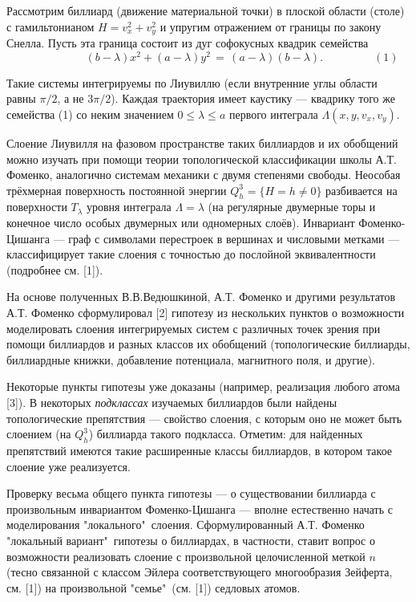 \vzmscaption

Рассмотрим биллиард (движение материальной точки) в плоской области (столе) с гамильтонианом $H = v_x^2 + v_y^2$ и упругим отражением от границы по закону Снелла. Пусть эта граница состоит из дуг софокусных квадрик семейства
\[ \qquad \qquad \qquad (b - \lambda) x^2 + (a - \lambda) y^2 \, = \, (a - \lambda) (b - \lambda). \qquad\qquad \,\,\, (1)\]

Такие системы интегрируемы по Лиувиллю (если внутренние углы области равны $\pi\slash 2$, а не $3\pi\slash 2$). Каждая траектория имеет каустику --- квадрику того же семейства (1) со неким значением $0 \le \lambda \le a$ первого интеграла $\Lambda(x, y, v_x, v_y)$.

Слоение Лиувилля на фазовом пространстве таких биллиардов и их обобщений можно изучать при помощи теории топологической классификации школы А.Т. Фоменко, аналогично системам механики с двумя степенями свободы. Неособая трёхмерная поверхность постоянной энергии $Q^3_h = \{H = h \ne 0\}$ разбивается на поверхности $T_\lambda$ уровня интеграла $\Lambda = \lambda$ (на регулярные двумерные торы и конечное число особых двумерных или одномерных слоёв). Инвариант Фоменко-Цишанга --- граф с символами перестроек в вершинах и числовыми метками --- классифицирует такие слоения с точностью до послойной эквивалентности (подробнее см. [1]).

На основе полученных В.В.Ведюшкиной, А.Т. Фоменко и другими результатов А.Т. Фоменко сформулировал [2] гипотезу из нескольких пунктов о возможности моделировать слоения интегрируемых систем с различных точек зрения при помощи биллиардов и разных классов их обобщений (топологические биллиарды, биллиардные книжки, добавление потенциала, магнитного поля, и другие).

Некоторые пункты гипотезы уже доказаны (например, реализация любого атома [3]). В некоторых \textit{подклассах} изучаемых биллиардов были найдены топологические препятствия --- свойство слоения, с которым оно не может быть слоением (на $Q^3_h$) биллиарда такого подкласса. Отметим: для найденных препятствий имеются такие расширенные классы биллиардов, в котором такое слоение уже реализуется.

Проверку весьма общего пункта гипотезы --- о существовании биллиарда с произвольным инвариантом Фоменко-Цишанга --- вполне естественно начать с моделирования "локального"\, слоения. Сформулированный А.Т. Фоменко "локальный вариант"\, гипотезы о биллиардах, в частности, ставит вопрос о возможности реализовать слоение с произвольной целочисленной меткой $n$ (тесно связанной с классом Эйлера соответствующего многообразия Зейферта, см. [1]) на произвольной "семье"\, (см. [1]) седловых атомов.

